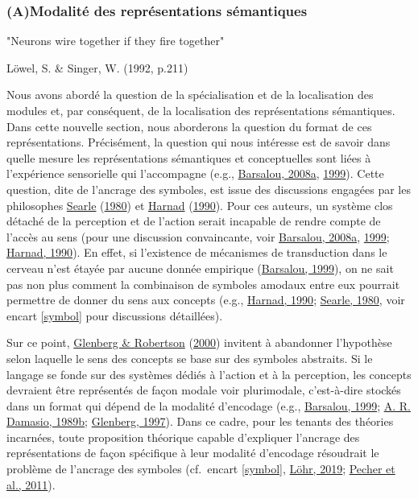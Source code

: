 \documentclass[
  a4paper,12pt,twoside,onecolumn,openright,final,oldfontcommands]{memoir}
\begin{document}
\hypertarget{amodalituxe9-des-repruxe9sentations-suxe9mantiques}{%
\subsubsection{(A)Modalité des représentations sémantiques}\label{amodalituxe9-des-repruxe9sentations-suxe9mantiques}}

\epigraph{"Neurons wire together if they fire together"}{Löwel, S. \& Singer, W. (1992, p.211)}

Nous avons abordé la question de la spécialisation et de la localisation des modules et, par conséquent, de la localisation des représentations sémantiques. Dans cette nouvelle section, nous aborderons la question du format de ces représentations. Précisément, la question qui nous intéresse est de savoir dans quelle mesure les représentations sémantiques et conceptuelles sont liées à l'expérience sensorielle qui l'accompagne (e.g., \protect\hyperlink{ref-barsalou_grounded_2008}{Barsalou, 2008a}, \protect\hyperlink{ref-barsalou_perceptual_1999}{1999}). Cette question, dite de l'ancrage des symboles, est issue des discussions engagées par les philosophes \protect\hyperlink{ref-searle_minds_1980}{Searle} (\protect\hyperlink{ref-searle_minds_1980}{1980}) et \protect\hyperlink{ref-harnad_symbol_1990}{Harnad} (\protect\hyperlink{ref-harnad_symbol_1990}{1990}). Pour ces auteurs, un système clos détaché de la perception et de l'action serait incapable de rendre compte de l'accès au sens (pour une discussion convaincante, voir \protect\hyperlink{ref-barsalou_grounded_2008}{Barsalou, 2008a}, \protect\hyperlink{ref-barsalou_perceptual_1999}{1999}; \protect\hyperlink{ref-harnad_symbol_1990}{Harnad, 1990}). En effet, si l'existence de mécanismes de transduction dans le cerveau n'est étayée par aucune donnée empirique (\protect\hyperlink{ref-barsalou_perceptual_1999}{Barsalou, 1999}), on ne sait pas non plus comment la combinaison de symboles amodaux entre eux pourrait permettre de donner du sens aux concepts (e.g., \protect\hyperlink{ref-harnad_symbol_1990}{Harnad, 1990}; \protect\hyperlink{ref-searle_minds_1980}{Searle, 1980}, voir encart \ref{symbol} pour discussions détaillées).

Sur ce point, \protect\hyperlink{ref-glenberg_symbol_2000}{Glenberg \& Robertson} (\protect\hyperlink{ref-glenberg_symbol_2000}{2000}) invitent à abandonner l'hypothèse selon laquelle le sens des concepts se base sur des symboles abstraits. Si le langage se fonde sur des systèmes dédiés à l'action et à la perception, les concepts devraient être représentés de façon modale voir plurimodale, c'est-à-dire stockés dans un format qui dépend de la modalité d'encodage (e.g., \protect\hyperlink{ref-barsalou_perceptual_1999}{Barsalou, 1999}; \protect\hyperlink{ref-damasio_time-locked_1989}{A. R. Damasio, 1989b}; \protect\hyperlink{ref-glenberg_what_1997}{Glenberg, 1997}). Dans ce cadre, pour les tenants des théories incarnées, toute proposition théorique capable d'expliquer l'ancrage des représentations de façon spécifique à leur modalité d'encodage résoudrait le problème de l'ancrage des symboles (cf.~encart \ref{symbol}, \protect\hyperlink{ref-lohr_embodied_2019}{Löhr, 2019}; \protect\hyperlink{ref-pecher_abstract_2011}{Pecher et al., 2011}).
\end{document}
